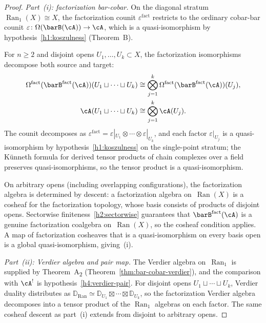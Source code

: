 \begin{proof}
\emph{Part~(i): factorization bar-cobar.}
On the diagonal stratum $\operatorname{Ran}_1(X) \cong X$, the
factorization counit $\varepsilon^{\mathrm{fact}}$ restricts to
the ordinary cobar-bar counit
$\varepsilon\colon \Omega(\barB(\cA)) \to \cA$,
which is a quasi-isomorphism by hypothesis~\ref{h1:koszulness}
(Theorem~B).

For $n \ge 2$ and disjoint opens
$U_1, \ldots, U_k \subset X$, the factorization isomorphisms
decompose both source and target:
\begin{align*}
\Omega^{\mathrm{fact}}(\barB^{\mathrm{fact}}(\cA))
 (U_1 \sqcup \cdots \sqcup U_k)
&\cong \bigotimes_{j=1}^k
 \Omega^{\mathrm{fact}}(\barB^{\mathrm{fact}}(\cA))(U_j), \\
\cA(U_1 \sqcup \cdots \sqcup U_k)
&\cong \bigotimes_{j=1}^k \cA(U_j).
\end{align*}
The counit decomposes as $\varepsilon^{\mathrm{fact}}
= \varepsilon|_{U_1} \otimes \cdots \otimes \varepsilon|_{U_k}$,
and each factor $\varepsilon|_{U_j}$ is a quasi-isomorphism
by hypothesis~\ref{h1:koszulness} on the single-point stratum;
the K\"unneth formula for derived tensor products of chain
complexes over a field preserves quasi-isomorphisms, so the
tensor product is a quasi-isomorphism.

On arbitrary opens (including overlapping configurations), the
factorization algebra is determined by descent: a factorization
algebra on~$\operatorname{Ran}(X)$ is a cosheaf for the
factorization topology, whose basis consists of products of disjoint
opens. Sectorwise finiteness~\ref{h2:sectorwise} guarantees that
$\barB^{\mathrm{fact}}(\cA)$ is a genuine factorization coalgebra
on~$\operatorname{Ran}(X)$, so
the cosheaf condition applies. A map of factorization cosheaves
that is a quasi-isomorphism on every basis open is a global
quasi-isomorphism, giving~(i).

\emph{Part~(ii): Verdier algebra and pair map.}
The Verdier algebra on~$\operatorname{Ran}_1$ is supplied by
Theorem~A\textsubscript{2}
(Theorem~\ref{thm:bar-cobar-verdier}), and the comparison with
$\cA^!$ is hypothesis~\ref{h4:verdier-pair}.
For disjoint opens
$U_1 \sqcup \cdots \sqcup U_k$, Verdier duality distributes as
$\mathbb{D}_{\mathrm{Ran}}
\simeq \mathbb{D}_{U_1} \boxtimes \cdots \boxtimes \mathbb{D}_{U_k}$,
so the factorization Verdier algebra decomposes into a tensor
product of the $\operatorname{Ran}_1$ algebras on each factor.
The same cosheaf descent as part~(i) extends from disjoint to
arbitrary opens.


\end{proof}
